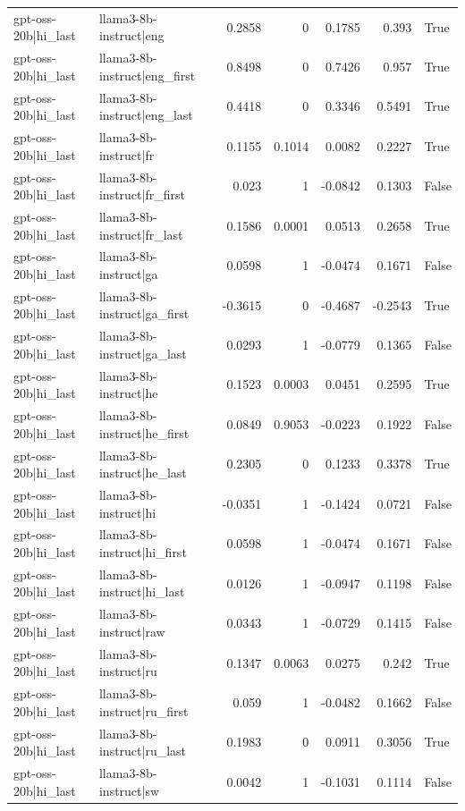 \begin{table}
\begin{tabular}{l l r r r r l}
gpt-oss-20b|hi_last & llama3-8b-instruct|eng & 0.2858 & 0 & 0.1785 & 0.393 & True \\
gpt-oss-20b|hi_last & llama3-8b-instruct|eng_first & 0.8498 & 0 & 0.7426 & 0.957 & True \\
gpt-oss-20b|hi_last & llama3-8b-instruct|eng_last & 0.4418 & 0 & 0.3346 & 0.5491 & True \\
gpt-oss-20b|hi_last & llama3-8b-instruct|fr & 0.1155 & 0.1014 & 0.0082 & 0.2227 & True \\
gpt-oss-20b|hi_last & llama3-8b-instruct|fr_first & 0.023 & 1 & -0.0842 & 0.1303 & False \\
gpt-oss-20b|hi_last & llama3-8b-instruct|fr_last & 0.1586 & 0.0001 & 0.0513 & 0.2658 & True \\
gpt-oss-20b|hi_last & llama3-8b-instruct|ga & 0.0598 & 1 & -0.0474 & 0.1671 & False \\
gpt-oss-20b|hi_last & llama3-8b-instruct|ga_first & -0.3615 & 0 & -0.4687 & -0.2543 & True \\
gpt-oss-20b|hi_last & llama3-8b-instruct|ga_last & 0.0293 & 1 & -0.0779 & 0.1365 & False \\
gpt-oss-20b|hi_last & llama3-8b-instruct|he & 0.1523 & 0.0003 & 0.0451 & 0.2595 & True \\
gpt-oss-20b|hi_last & llama3-8b-instruct|he_first & 0.0849 & 0.9053 & -0.0223 & 0.1922 & False \\
gpt-oss-20b|hi_last & llama3-8b-instruct|he_last & 0.2305 & 0 & 0.1233 & 0.3378 & True \\
gpt-oss-20b|hi_last & llama3-8b-instruct|hi & -0.0351 & 1 & -0.1424 & 0.0721 & False \\
gpt-oss-20b|hi_last & llama3-8b-instruct|hi_first & 0.0598 & 1 & -0.0474 & 0.1671 & False \\
gpt-oss-20b|hi_last & llama3-8b-instruct|hi_last & 0.0126 & 1 & -0.0947 & 0.1198 & False \\
gpt-oss-20b|hi_last & llama3-8b-instruct|raw & 0.0343 & 1 & -0.0729 & 0.1415 & False \\
gpt-oss-20b|hi_last & llama3-8b-instruct|ru & 0.1347 & 0.0063 & 0.0275 & 0.242 & True \\
gpt-oss-20b|hi_last & llama3-8b-instruct|ru_first & 0.059 & 1 & -0.0482 & 0.1662 & False \\
gpt-oss-20b|hi_last & llama3-8b-instruct|ru_last & 0.1983 & 0 & 0.0911 & 0.3056 & True \\
gpt-oss-20b|hi_last & llama3-8b-instruct|sw & 0.0042 & 1 & -0.1031 & 0.1114 & False \\

\end{tabular}
\end{table}
